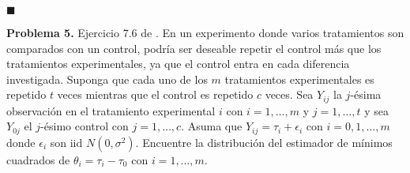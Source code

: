 \documentclass[12pt]{article}
\theoremstyle{plain}
\theoremstyle{definition}
\theoremstyle{definition}
\theoremstyle{definition}
\begin{document}
\begin{flushright}
$\blacksquare$
\end{flushright}
\textbf{Problema 5.} Ejercicio 7.6 de \cite{ravishanker2001first}. En un experimento donde varios tratamientos son comparados con un control, podría ser deseable repetir el control más que los tratamientos experimentales, ya que el control entra en cada diferencia investigada. Suponga que cada uno de los $m$ tratamientos experimentales es repetido $t$ veces mientras que el control es repetido $c$ veces. Sea $Y_{ij}$ la $j$-ésima observación en el tratamiento experimental $i$ con $i=1,\ldots,m$ y $j=1,\ldots,t$ y sea $Y_{0j}$ el $j$-ésimo control con $j=1,\ldots,c$. Asuma que $Y_{ij} = \tau_i + \epsilon_i$ con $i=0,1,\ldots,m$ donde $\epsilon_i$ son iid $N(0,\sigma^2)$. Encuentre la distribución del estimador de mínimos cuadrados de $\theta_i = \tau_i - \tau_0$ con $i = 1, \ldots, m$.
\end{document}
